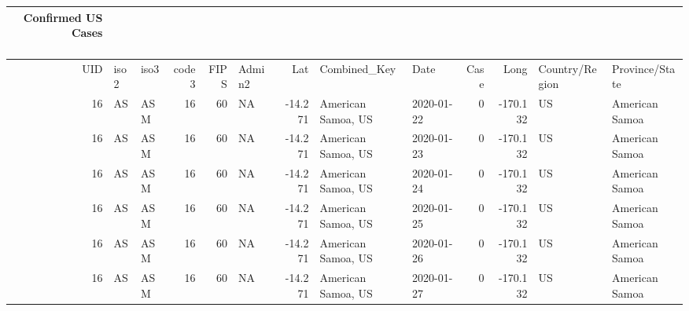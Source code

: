 \documentclass[
]{article}
\newenvironment{Shaded}{\begin{snugshade}}{\end{snugshade}}
\newcommand{\DataTypeTok}[1]{\textcolor[rgb]{0.13,0.29,0.53}{#1}}
\newcommand{\KeywordTok}[1]{\textcolor[rgb]{0.13,0.29,0.53}{\textbf{#1}}}
\newcommand{\NormalTok}[1]{#1}
\newcommand{\OperatorTok}[1]{\textcolor[rgb]{0.81,0.36,0.00}{\textbf{#1}}}
\newcommand{\StringTok}[1]{\textcolor[rgb]{0.31,0.60,0.02}{#1}}
\begin{document}
\begin{Shaded}
\end{Shaded}

\captionsetup[table]{labelformat=empty,skip=1pt}
\begin{longtable}{rllrrlrllrrll}
\caption*{
\large Confirmed US Cases\\ 
\small ~\\ 
} \\ 
\toprule
UID & iso2 & iso3 & code3 & FIPS & Admin2 & Lat & Combined\_Key & Date & Case & Long & Country/Region & Province/State \\ 
\midrule
16 & AS & ASM & 16 & 60 & NA & -14.271 & American Samoa, US & 2020-01-22 & 0 & -170.132 & US & American Samoa \\ 
16 & AS & ASM & 16 & 60 & NA & -14.271 & American Samoa, US & 2020-01-23 & 0 & -170.132 & US & American Samoa \\ 
16 & AS & ASM & 16 & 60 & NA & -14.271 & American Samoa, US & 2020-01-24 & 0 & -170.132 & US & American Samoa \\ 
16 & AS & ASM & 16 & 60 & NA & -14.271 & American Samoa, US & 2020-01-25 & 0 & -170.132 & US & American Samoa \\ 
16 & AS & ASM & 16 & 60 & NA & -14.271 & American Samoa, US & 2020-01-26 & 0 & -170.132 & US & American Samoa \\ 
16 & AS & ASM & 16 & 60 & NA & -14.271 & American Samoa, US & 2020-01-27 & 0 & -170.132 & US & American Samoa \\ 
\bottomrule
\end{longtable}

\begin{Shaded}
\end{Shaded}
\end{document}
